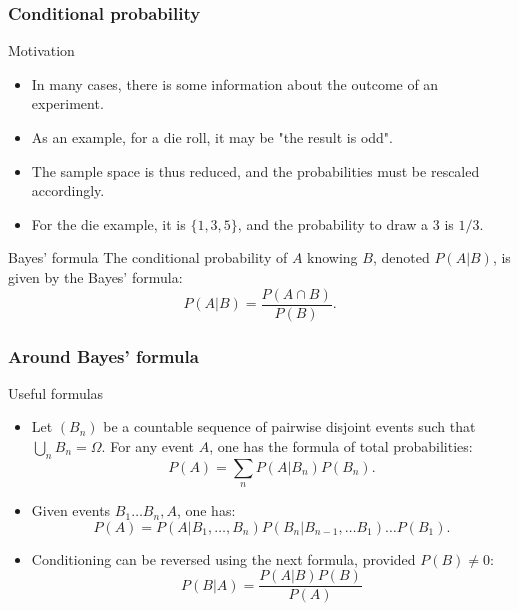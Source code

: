 \begin{frame}
    \frametitle{Conditional probability}
    \begin{block}{Motivation}
    \begin{itemize}
        \item<+-> In many cases, there is some information about the outcome of
        an experiment.
        \item<+-> As an example, for a die roll, it may be "the result is odd".
        \item<+-> The sample space is thus reduced, and the probabilities must 
        be rescaled accordingly.
        \item<+-> For the die example, it is $\{1,3,5\}$, and the probability 
        to draw a $3$ is $1/3.$
    \end{itemize}
    \end{block}
    \begin{block}{Bayes' formula}
        The conditional probability of $A$ knowing $B$, denoted $P\left( A \vert B \right)$, is given by the Bayes' formula:
        \begin{equation}
            P\left( A \vert B  \right) = \frac{P\left( A \cap B \right)}{P(B)}.
        \end{equation}
    \end{block}
\end{frame}
\begin{frame}
    \frametitle{Around Bayes' formula}
    \begin{block}{Useful formulas}
    \begin{itemize}
        \item<+-> Let $\left(B_n\right)$ be a countable sequence of pairwise disjoint events such that $\bigcup_n B_n = \Omega.$ For any event $A$,
        one has the formula of total probabilities:
        \begin{equation}
            P\left( A \right) = \sum_n P\left( A \vert B_n \right) P\left( B_n \right).
        \end{equation}
        \item<+-> Given events $B_1 \dots B_n, A$, one has:
        \begin{equation}
            P\left( A \right) = P\left( A \vert B_1, \dots, B_n \right)P(B_n \vert B_{n-1}, \dots B_1)\dots P\left( B_1 \right).
        \end{equation}
        \item<+-> Conditioning can be reversed using the next formula, provided $P(B) \neq 0:$
        \begin{equation}
            P\left( B \vert A \right) = \frac{P\left( A \vert B \right) P(B)}{P(A)}
        \end{equation}
       \end{itemize}
    \end{block}
\end{frame}

